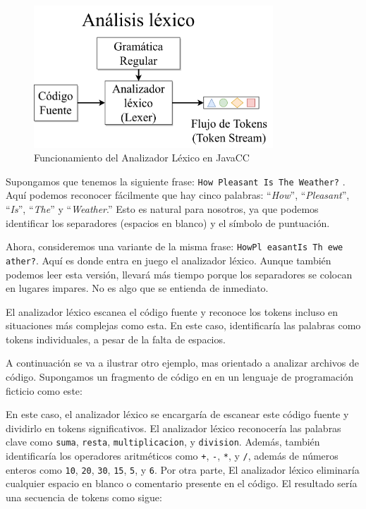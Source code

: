 

\begin{figure}[H]
	\centering
	\includegraphics[width=0.8\textwidth]{imagenes/analizadorlexico.png}
	\caption{Funcionamiento del Analizador Léxico en JavaCC\cite{ytanalizadorlexico}}
	\label{fig:analizadorlexico}
\end{figure}

Supongamos que tenemos la siguiente frase: \lstinline|How Pleasant Is The Weather?| . Aquí podemos reconocer fácilmente que hay cinco palabras: “\textit{How}”, “\textit{Pleasant}”, “\textit{Is}”, “\textit{The}” y “\textit{Weather}.” Esto es natural para nosotros, ya que podemos identificar los separadores (espacios en blanco) y el símbolo de puntuación.

Ahora, consideremos una variante de la misma frase: \lstinline|HowPl easantIs Th ewe ather?|. Aquí es donde entra en juego el analizador léxico. Aunque también podemos leer esta versión, llevará más tiempo porque los separadores se colocan en lugares impares. No es algo que se entienda de inmediato.

El analizador léxico escanea el código fuente y reconoce los tokens incluso en situaciones más complejas como esta. En este caso, identificaría las palabras como tokens individuales, a pesar de la falta de espacios.

A continuación se va a ilustrar otro ejemplo, mas orientado a analizar archivos de código. Supongamos un fragmento de código en en un lenguaje de programación ficticio como este:

\lstset{inputencoding=utf8/latin1}


En este caso, el analizador léxico se encargaría de escanear este código fuente y dividirlo en tokens significativos. El analizador léxico reconocería las palabras clave como \lstinline|suma|, \lstinline|resta|, \lstinline|multiplicacion|, y \lstinline|division|. Además, también identificaría los operadores aritméticos como \lstinline|+|, \lstinline|-|,  \lstinline|*|, y  \lstinline|/|, además de números enteros como  \lstinline|10|,  \lstinline|20|,  \lstinline|30|,  \lstinline|15|,  \lstinline|5|, y \lstinline|6|. Por otra parte, El analizador léxico eliminaría cualquier espacio en blanco o comentario presente en el código. El resultado sería una secuencia de tokens como sigue:

